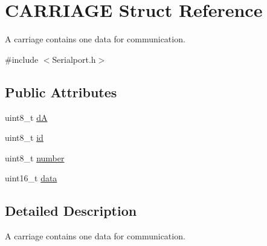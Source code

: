 \hypertarget{struct_c_a_r_r_i_a_g_e}{\section{C\-A\-R\-R\-I\-A\-G\-E Struct Reference}
\label{struct_c_a_r_r_i_a_g_e}
}


A carriage contains one data for communication.  




{\ttfamily \#include $<$Serialport.\-h$>$}

\subsection*{Public Attributes}
\begin{DoxyCompactItemize}
\item 
uint8\-\_\-t \hyperlink{struct_c_a_r_r_i_a_g_e_a7b462035ed4963a2a57b0e0e4adee637}{d\-A}
\item 
uint8\-\_\-t \hyperlink{struct_c_a_r_r_i_a_g_e_a5472d5cf9356b01a56b2a3326014488b}{id}
\item 
uint8\-\_\-t \hyperlink{struct_c_a_r_r_i_a_g_e_a0180ffaa7faf81664b6404f0108cea4f}{number}
\item 
uint16\-\_\-t \hyperlink{struct_c_a_r_r_i_a_g_e_a8fde33d8c82ca9f730e4bfb46dc33764}{data}
\end{DoxyCompactItemize}


\subsection{Detailed Description}
A carriage contains one data for communication. 

